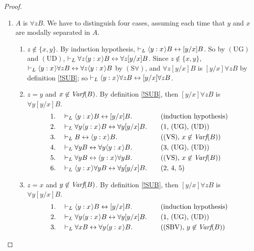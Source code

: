 \documentclass[11pt]{woarticle}
\theoremstyle{break}
\theoremstyle{nonumberplain}
\newcommand{\1}{\;\,|\;\,}
\newcommand{\fvar}{\emph{Varf}}
\renewcommand{\t}[1]{\ensuremath{\langle #1  \makebox[.2ex]{}\rangle}}
\newcommand{\T}[1]{\ensuremath{(\mathrm{ #1})}}
\begin{document}
\begin{proof}
\begin{enumerate}
  \item $A$ is $\forall z B$.\; We have to distinguish four cases,
    assuming each time that $y$ and $x$ are modally separated in $A$.
    \begin{enumerate}
    \item $z \not\in \{x,y\}$.\; By induction hypothesis, $\vdash_{L}
      \t{y:x}B \leftrightarrow [y/x]B$. So by \T{UG} and \T{UD},
      $\vdash_{L} \forall z\t{y:x}B \leftrightarrow \forall
      z[y/x]B$. Since $z\not\in \{x,y\}$, $\vdash_{L} \t{y:x}\forall z
      B \leftrightarrow \forall z \t{y:x}B$ by \T{S\forall}, and
      $\forall z[y/x]B$ is $[y/x]\forall zB$ by definition \ref{!SUB};
      so $\vdash_{L} \t{y:x}\forall zB \leftrightarrow [y/x]\forall
      zB$.
    \item $z=y$ and $x\not\in \fvar(B)$.\; By definition \ref{!SUB},
      then $[y/x]\forall z B$ is $\forall y[y/x]B$.
      \begin{alignat*}{2}
        1.\quad& \vdash_L \t{y:x}B \leftrightarrow [y/x]B. &\quad&\text{(induction hypothesis)}\\
        2.\quad& \vdash_L \forall y\t{y:x}B \leftrightarrow \forall y[y/x]B.
               &&\text{(1, \T{UG}, \T{UD})}\\
        3.\quad& \vdash_L B \leftrightarrow \t{y:x}B. &&\text{(\T{VS}, $x \not\in \fvar(B)$)}\\
        4.\quad& \vdash_L \forall y B \leftrightarrow \forall y\t{y:x}B.
               &&\text{(3, \T{UG}, \T{UD})}\\
        5.\quad& \vdash_L \forall y B \leftrightarrow \t{y:x}\forall y B.
               &&\text{(\T{VS}, $x \not\in \fvar(B)$)}\\
        6.\quad& \vdash_L \t{y:x} \forall y B \leftrightarrow \forall y [y/x]B. 
               &&\text{(2, 4, 5)}
      \end{alignat*}
    \item $z=x$ and $y\not\in \fvar(B)$.\; By definition \ref{!SUB},
      then $[y/x]\forall z B$ is $\forall y[y/x]B$.
      \begin{alignat*}{2}
        1.\quad& \vdash_L \t{y:x}B \leftrightarrow [y/x]B. &\quad&\text{(induction hypothesis)}\\
        2.\quad& \vdash_L \forall y\t{y:x}B \leftrightarrow \forall y[y/x]B.
               &&\text{(1, \T{UG}, \T{UD})}\\
        3.\quad& \vdash_L \forall x B \leftrightarrow \forall y \t{y:x}B.
               &&\text{(\T{SBV}, $y\not\in \fvar(B)$)}\\

\end{alignat*}
\end{enumerate}
\end{enumerate}
\end{proof}
\end{document}
